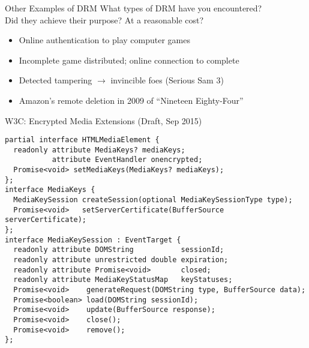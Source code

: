 \documentclass{beamer}
\begin{document}
\begin{frame}{Other Examples of DRM}
What types of DRM have you encountered? \\
\bigskip
Did they achieve their purpose? At a reasonable cost?\\
\bigskip
\pause
\begin{itemize}
\item Online authentication to play computer games
\item Incomplete game distributed; online connection to complete
\item Detected tampering $\rightarrow$ invincible foes (Serious Sam 3)
\item Amazon's remote deletion in 2009 of ``Nineteen Eighty-Four''
\end{itemize}
\end{frame}

\begin{frame}[fragile]{W3C: Encrypted Media Extensions (Draft, Sep 2015)}
\footnotesize
\begin{lstlisting}
partial interface HTMLMediaElement {
  readonly attribute MediaKeys? mediaKeys;
           attribute EventHandler onencrypted;
  Promise<void> setMediaKeys(MediaKeys? mediaKeys);
};
interface MediaKeys {
  MediaKeySession createSession(optional MediaKeySessionType type);
  Promise<void>   setServerCertificate(BufferSource serverCertificate);
};
interface MediaKeySession : EventTarget {
  readonly attribute DOMString           sessionId;
  readonly attribute unrestricted double expiration;
  readonly attribute Promise<void>       closed;
  readonly attribute MediaKeyStatusMap   keyStatuses;
  Promise<void>    generateRequest(DOMString type, BufferSource data);
  Promise<boolean> load(DOMString sessionId);
  Promise<void>    update(BufferSource response);
  Promise<void>    close();
  Promise<void>    remove();
};
\end{lstlisting}
\end{frame}
\end{document}
